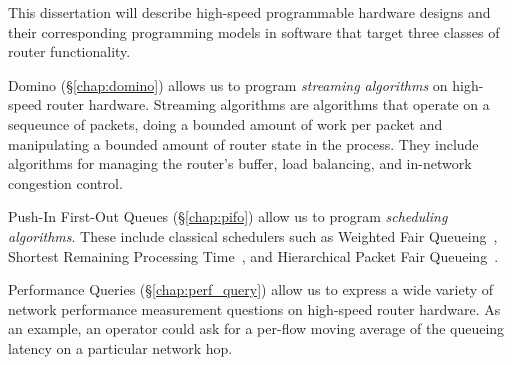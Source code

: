 This dissertation will describe high-speed programmable hardware designs and
their corresponding programming models in software that target three classes of
router functionality.
\begin{CompactEnumerate}
\item Domino (\S\ref{chap:domino}) allows us to program \textit{streaming
algorithms} on high-speed router hardware. Streaming algorithms are algorithms
that operate on a sequeunce of packets, doing a bounded amount of work per
packet and manipulating a bounded amount of router state in the process. They
include algorithms for managing the router's buffer, load balancing, and
in-network congestion control.
\item Push-In First-Out Queues (\S\ref{chap:pifo}) allow us to program \textit{
scheduling algorithms}. These include classical schedulers such as Weighted
Fair Queueing~\cite{wfq}, Shortest Remaining Processing Time~\cite{srpt}, and
Hierarchical Packet Fair Queueing~\cite{hpfq}.
\item Performance Queries (\S\ref{chap:perf_query}) allow us to express a wide
variety of network performance measurement questions on high-speed router hardware. As an example, an operator could ask for a per-flow moving average of the
queueing latency on a particular network hop.
\end{CompactEnumerate}

